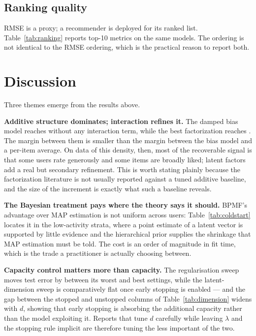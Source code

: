 \documentclass[conference]{IEEEtran}
\begin{document}
\subsection{Ranking quality}

\begin{table}[t]
\caption{Top-10 ranking quality, with training items masked. Users with no relevant test
item are excluded rather than scored zero.}
\label{tab:ranking}
\centering
\small

\end{table}

RMSE is a proxy; a recommender is deployed for its ranked list. Table~\ref{tab:ranking}
reports top-10 metrics on the same models. The ordering is not identical to the RMSE
ordering, which is the practical reason to report both.

\section{Discussion}

Three themes emerge from the results above.

\textbf{Additive structure dominates; interaction refines it.} The damped bias model
reaches \BiasBaselineRMSE{} without any interaction term, while the best factorization
reaches \BestRMSE. The margin between them is smaller than the margin between the bias
model and a per-item average. On data of this density, then, most of the recoverable
signal is that some users rate generously and some items are broadly liked; latent factors
add a real but secondary refinement. This is worth stating plainly because the factorization
literature is not usually reported against a tuned additive baseline, and the size of the
increment is exactly what such a baseline reveals.

\textbf{The Bayesian treatment pays where the theory says it should.} BPMF's advantage over
MAP estimation is not uniform across users: Table~\ref{tab:coldstart} locates it in the
low-activity strata, where a point estimate of a latent vector is supported by little
evidence and the hierarchical prior supplies the shrinkage that MAP estimation must be told.
The cost is an order of magnitude in fit time, which is the trade a practitioner is
actually choosing between.

\textbf{Capacity control matters more than capacity.} The regularisation sweep moves test
error by \NoRegCost{} between its worst and best settings, while the latent-dimension sweep
is comparatively flat once early stopping is enabled --- and the gap between the stopped and
unstopped columns of Table~\ref{tab:dimension} widens with $d$, showing that early stopping
is absorbing the additional capacity rather than the model exploiting it. Reports that tune
$d$ carefully while leaving $\lambda$ and the stopping rule implicit are therefore tuning
the less important of the two.
\end{document}
